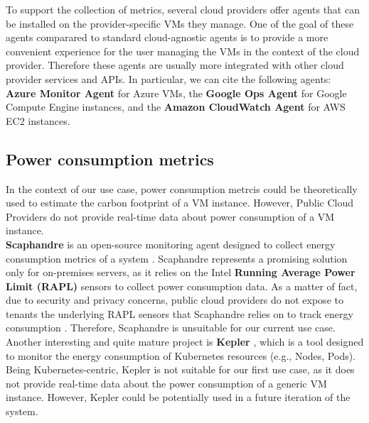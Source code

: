 To support the collection of metrics, several cloud providers offer agents that can be installed on the provider-specific VMs they manage.
One of the goal of these agents comparared to standard cloud-agnostic agents is to provide a more convenient experience for the user managing the VMs in the context of the cloud provider. 
Therefore these agents are usually more integrated with other cloud provider services and APIs.
In particular, we can cite the following agents: \textbf{Azure Monitor Agent} for Azure VMs, the \textbf{Google Ops Agent} for Google Compute Engine instances, and the \textbf{Amazon CloudWatch Agent} for AWS EC2 instances.

\subsection{Power consumption metrics}

In the context of our use case, power consumption metrcis could be theoretically used to estimate the carbon footprint of a VM instance.
However, Public Cloud Providers do not provide real-time data about power consumption of a VM instance. \\

\textbf{Scaphandre} is an open-source monitoring agent designed to collect energy consumption metrics of a system \cite{scaphandre}.
Scaphandre represents a promising solution only for on-premises servers, as it relies on the Intel \textbf{Running Average Power Limit (RAPL)} sensors to collect power consumption data.
As a matter of fact, due to security and privacy concerns, public cloud providers do not expose to tenants the underlying RAPL sensors that Scaphandre relies on to track energy consumption \cite{scaphandre_github_issue}.
Therefore, Scaphandre is unsuitable for our current use case.
Another interesting and quite mature project is \textbf{Kepler} \cite{kepler}, which is a tool designed to monitor the energy consumption of Kubernetes resources (e.g., Nodes, Pods).
Being Kubernetes-centric, Kepler is not suitable for our first use case, as it does not provide real-time data about the power consumption of a generic VM instance.
However, Kepler could be potentially used in a future iteration of the system.

